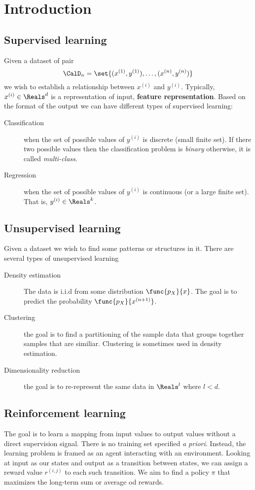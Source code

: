\chapter{Introduction}
\section{Supervised learning}
Given a dataset of pair
\begin{equation}
    \CalD_n = \set{(x^{(1)}, y^{(1)}) , \dots , (x^{(n)}, y^{(n)})}
\end{equation}
we wish to establish a relationship between \(x^{(i)} \) and \(y^{(i)}\). Typically, \(x^{(i)} \in \Reals^d\) is a representation of input, \textbf{feature representation}. Based on the format of the output we can have different types of supervised learning:
\begin{description}
    \item [Classification] when the set of possible values of \(y^{(i)}\) is discrete (small finite set). If there two possible values then the classification problem is \textit{binary} otherwise, it is called \textit{multi-class}.
    \item [Regression] when the set of possible values of \(y^{(i)}\) is continuous (or a large finite set). That is, \(y^{(i)} \in \Reals^k\).
\end{description}

\section{Unsupervised learning}
Given a dataset we wish to find some patterns or structures in it. There are several types of unsupervised learning
\begin{description}
    \item [Density estimation] The data is i.i.d from some distribution \(\func{p_X}{x}\). The goal is to predict the probability \(\func{p_X}{x^{(n+1)}}\).
    \item [Clustering] the goal is to find a partitioning of the sample data that groups together samples that are similiar. Clustering is sometimes used in density estimation.
    \item [Dimensionality reduction] the goal is to re-represent the same data in \(\Reals^l\) where \(l < d\).
\end{description}

\section{Reinforcement learning}
The goal is to learn a mapping from input values to output values without a direct supervision signal. There is no training set specified \textit{a priori}. Instead, the learning problem is framed as an agent interacting with an environment. Looking at input as our states and output as a transition between states, we can assign a reward value \(r^{(i,j)}\) to each such transition. We aim to find a policy \(\pi\) that maximizes the long-term sum or average od rewards.


